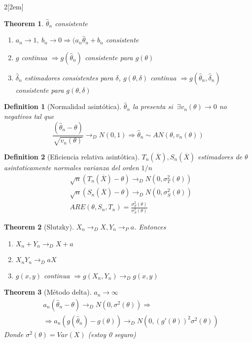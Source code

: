 \documentclass[leqno]{article}
\newtheorem*{theorem}{Theorem}
\newtheorem*{definition}{Definition}
\begin{document}
\begin{multicols}{2}[\columnsep2em]
\begin{theorem} $\hat{\theta }_n$ consistente
  \begin{enumerate}[topsep=-6pt, itemsep=0pt]
    \item $a_n \to  1, \ b_n \to  0 \Rightarrow (a_n \hat{\theta }_n + b_n$ consistente
	\item $g$ continua $\Rightarrow g(\hat{\theta}_n)$ consistente para $g(\theta)$
	\item $\hat{\delta}_n$ estimadores consistentes para $\delta$, $g(\theta , \delta)$ continua  $\Rightarrow g(\hat{\theta }_n, \hat{\delta}_n)$ consistente para $g(\theta , \delta)$
  \end{enumerate}
\end{theorem}

\begin{definition}[Normalidad asintótica]  $\hat{\theta }_n$ la presenta si $\ \exists v_n(\theta ) \to  0$ no negativos tal que
  \[
	\frac{(\hat{\theta }_n-\theta )}{\sqrt{v_n(\theta )} } \to_D N(0,1) \Rightarrow \hat{\theta }_n \sim AN(\theta , v_n(\theta ))
  \] 
\end{definition}

\begin{definition}[Eficiencia relativa asintótica] $T_n(\overline{X}), S_n(\overline{X})$ estimadores de $\theta$ asintoticamente normales varianza del orden $1 / n$
  \begin{align*}
	 &\sqrt{n}(T_n(\overline{X})-\theta )  \to _D N(0, \sigma_T^2(\theta)) \\
	 &\sqrt{n}(S_n(\overline{X})-\theta )  \to _D N(0, \sigma_S^2(\theta)) \\
	 &ARE(\theta, S_n, T_n) = \frac{\sigma ^2_T(\theta )}{\sigma ^2_S(\theta )}
  \end{align*}

\end{definition}

\begin{theorem}[Slutzky] $X_n \to _D X, Y_n \to _P a$. Entonces
  \begin{enumerate}[topsep=-6pt, itemsep=0pt]
	\item $X_n + Y_n \to _D X+a$ 
	\item $X_nY_n \to _D aX$
	\item $g(x,y)$ continua  $\Rightarrow g(X_n, Y_n) \to _D g(x,y)$
  \end{enumerate}
\end{theorem}

\begin{theorem}[Método delta] $a_n \to \infty$
  \begin{align*}
  &a_n(\hat{\theta }_n-\theta ) \to _D N(0, \sigma ^2(\theta )) \Rightarrow \\
  & \Rightarrow a_n(g(\hat{\theta }_n)-g(\theta) ) \to _D N(0, (g'(\theta ))^2 \sigma ^2(\theta ))
  \end{align*}
  Donde $\sigma ^2(\theta) = Var(X)$ (estoy 0 seguro)
\end{theorem}


\end{multicols}
\end{document}
